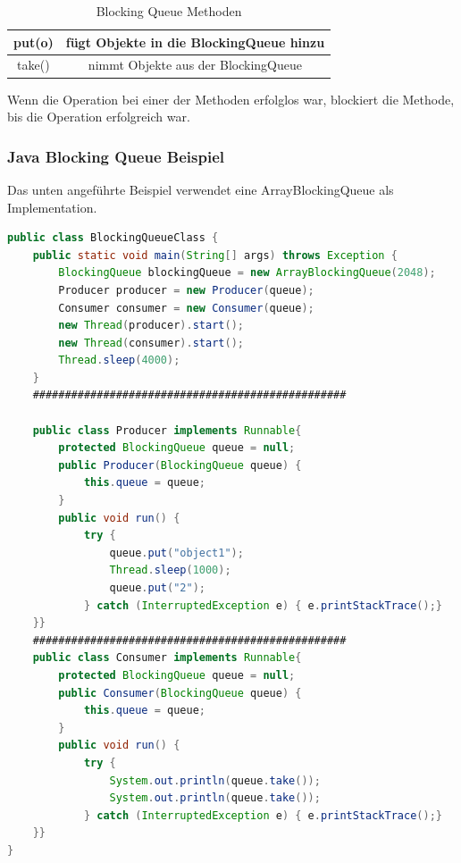 \begin{table}[h]
    \centering
    \begin{tabular}{ |c|c| }
     \hline
     put(o) & fügt Objekte in die BlockingQueue hinzu \\
     \hline
     take() & nimmt Objekte aus der BlockingQueue \\
     \hline
    \end{tabular}
    \caption{Blocking Queue Methoden \cite{javaBlockingQueue}}
    \label{tab:allgemein:blockingQueueMethoden}
\end{table}

Wenn die Operation bei einer der Methoden erfolglos war, blockiert die Methode, bis die Operation erfolgreich war. \cite{javaBlockingQueue}
 
\subsubsection{Java Blocking Queue Beispiel}
Das unten angeführte Beispiel verwendet eine ArrayBlockingQueue als Implementation.
 
 
 
\begin{lstlisting}[language=java,caption=Java BlockingQueue Beispiel,label=lst:impl:blockingQueue]
    public class BlockingQueueClass {
    public static void main(String[] args) throws Exception {
        BlockingQueue blockingQueue = new ArrayBlockingQueue(2048);
        Producer producer = new Producer(queue);
        Consumer consumer = new Consumer(queue);
        new Thread(producer).start();
        new Thread(consumer).start();
        Thread.sleep(4000);
    }
    #################################################
 
    public class Producer implements Runnable{
        protected BlockingQueue queue = null;
        public Producer(BlockingQueue queue) {
            this.queue = queue;
        }
        public void run() {
            try {
                queue.put("object1");
                Thread.sleep(1000);
                queue.put("2");
            } catch (InterruptedException e) { e.printStackTrace();}
    }}
    #################################################
    public class Consumer implements Runnable{
        protected BlockingQueue queue = null;
        public Consumer(BlockingQueue queue) {
            this.queue = queue;
        }
        public void run() {
            try {
                System.out.println(queue.take());
                System.out.println(queue.take());
            } catch (InterruptedException e) { e.printStackTrace();}
    }}
}
\end{lstlisting}
\cite{javaBlockingQueue}
 
